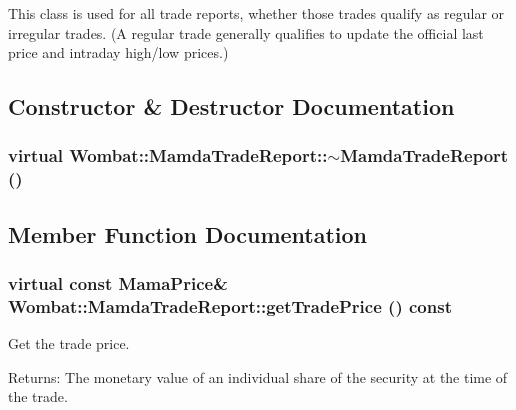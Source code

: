This class is used for all trade reports, whether those trades qualify as regular or irregular trades. (A regular trade generally qualifies to update the official last price and intraday high/low prices.) 



\subsection{Constructor \& Destructor Documentation}
\hypertarget{classWombat_1_1MamdaTradeReport_ea6554151d67418f4865dc9ba3bf22b9}{
\subsubsection[$\sim$MamdaTradeReport]{\setlength{\rightskip}{0pt plus 5cm}virtual Wombat::Mamda\-Trade\-Report::$\sim$Mamda\-Trade\-Report ()}}
\label{classWombat_1_1MamdaTradeReport_ea6554151d67418f4865dc9ba3bf22b9}




\subsection{Member Function Documentation}
\hypertarget{classWombat_1_1MamdaTradeReport_97a38026a45edb298ffe62530d43cde4}{
\subsubsection[getTradePrice]{\setlength{\rightskip}{0pt plus 5cm}virtual const Mama\-Price\& Wombat::Mamda\-Trade\-Report::get\-Trade\-Price () const}}
\label{classWombat_1_1MamdaTradeReport_97a38026a45edb298ffe62530d43cde4}


Get the trade price. 

\begin{Desc}
\item[Returns:]The monetary value of an individual share of the security at the time of the trade. \end{Desc}


